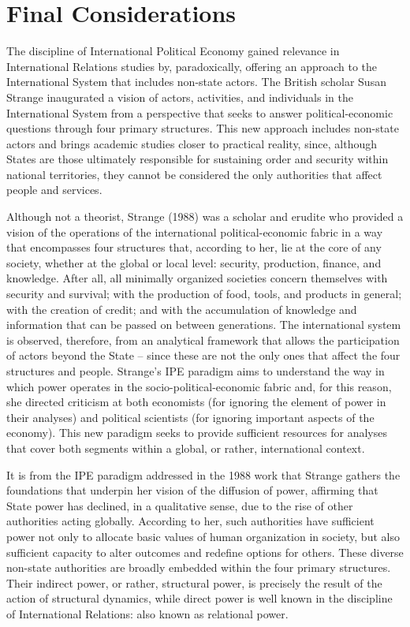 \chapter*{Final Considerations}

The discipline of International Political Economy gained relevance in International Relations studies by, paradoxically, offering an approach to the International System that includes non-state actors. The British scholar Susan Strange inaugurated a vision of actors, activities, and individuals in the International System from a perspective that seeks to answer political-economic questions through four primary structures. This new approach includes non-state actors and brings academic studies closer to practical reality, since, although States are those ultimately responsible for sustaining order and security within national territories, they cannot be considered the only authorities that affect people and services.

Although not a theorist, Strange (1988) was a scholar and erudite who provided a vision of the operations of the international political-economic fabric in a way that encompasses four structures that, according to her, lie at the core of any society, whether at the global or local level: security, production, finance, and knowledge. After all, all minimally organized societies concern themselves with security and survival; with the production of food, tools, and products in general; with the creation of credit; and with the accumulation of knowledge and information that can be passed on between generations. The international system is observed, therefore, from an analytical framework that allows the participation of actors beyond the State -- since these are not the only ones that affect the four structures and people. Strange's IPE paradigm aims to understand the way in which power operates in the socio-political-economic fabric and, for this reason, she directed criticism at both economists (for ignoring the element of power in their analyses) and political scientists (for ignoring important aspects of the economy). This new paradigm seeks to provide sufficient resources for analyses that cover both segments within a global, or rather, international context.

It is from the IPE paradigm addressed in the 1988 work that Strange gathers the foundations that underpin her vision of the diffusion of power, affirming that State power has declined, in a qualitative sense, due to the rise of other authorities acting globally. According to her, such authorities have sufficient power not only to allocate basic values of human organization in society, but also sufficient capacity to alter outcomes and redefine options for others. These diverse non-state authorities are broadly embedded within the four primary structures. Their indirect power, or rather, structural power, is precisely the result of the action of structural dynamics, while direct power is well known in the discipline of International Relations: also known as relational power.

